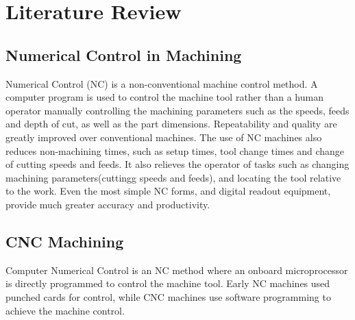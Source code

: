 \chapter{Literature Review}
\lhead{\leftmark}
\label{sec:review}
\section{Numerical Control in Machining}
Numerical Control (NC) is a non-conventional machine control method. A computer program is used to control the machine tool rather than a human operator manually controlling the machining parameters such as the speeds, feeds and depth of cut, as well as the part dimensions. Repeatability and quality are greatly improved over conventional machines. The use of NC machines also reduces non-machining times, such as setup times, tool change times and change of cutting speeds and feeds. It also relieves the operator of tasks such as changing machining parameters(cuttingg speeds and feeds), and locating the tool relative to the work. Even the most simple NC forms, and digital readout equipment, provide much greater accuracy and productivity.
\section{CNC Machining}
Computer Numerical Control is an NC method where an onboard microprocessor is directly programmed to control the machine tool. Early NC machines used punched cards for control, while CNC machines use software programming to achieve the machine control.
